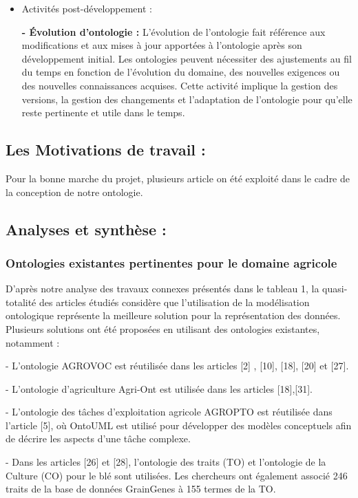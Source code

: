 \documentclass{article}
\begin{document}
\begin{itemize}
	\item Activités post-développement :
	
	\textbf{- Évolution d'ontologie :} L'évolution de l'ontologie fait référence aux modifications et aux
	mises à jour apportées à l'ontologie après son développement initial. Les ontologies peuvent
	nécessiter des ajustements au fil du temps en fonction de l'évolution du domaine, des nouvelles
	exigences ou des nouvelles connaissances acquises. Cette activité implique la gestion des
	versions, la gestion des changements et l'adaptation de l'ontologie pour qu'elle reste pertinente
	et utile dans le temps.
	\end{itemize}
	
	\subsection{Les Motivations de travail :}
	Pour la bonne marche du projet, plusieurs article on été exploité dans le cadre de la conception de notre ontologie.
	
	\subsection{Analyses et synthèse :}
	\subsubsection{Ontologies existantes pertinentes pour le domaine agricole}
	D'après notre analyse des travaux connexes présentés dans le tableau 1, la quasi-
	totalité des articles étudiés considère que l'utilisation de la modélisation ontologique représente
	la meilleure solution pour la représentation des données. Plusieurs solutions ont été proposées
	en utilisant des ontologies existantes, notamment :
	
	- L'ontologie AGROVOC est réutilisée dans les articles [2] , [10], [18], [20] et [27].
	
	- L'ontologie d'agriculture Agri-Ont est utilisée dans les articles [18],[31].
	
	- L'ontologie des tâches d'exploitation agricole AGROPTO est réutilisée dans l'article [5], où
	OntoUML est utilisé pour développer des modèles conceptuels afin de décrire les aspects d'une
	tâche complexe.
	
	- Dans les articles [26] et [28], l'ontologie des traits (TO) et l'ontologie de la Culture (CO) pour
	le blé sont utilisées. Les chercheurs ont également associé 246 traits de la base de données
	GrainGenes à 155 termes de la TO.
	
\end{document}
